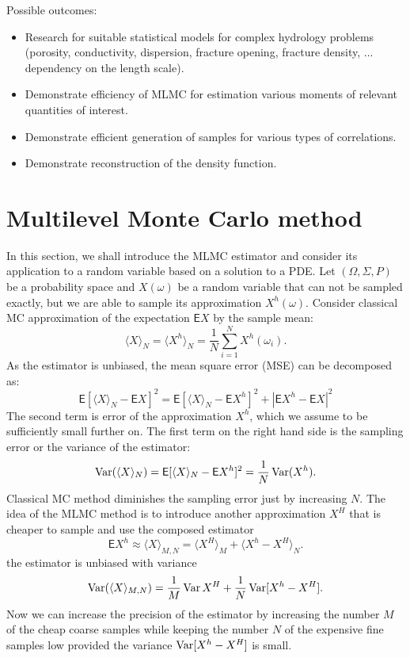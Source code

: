 \documentclass{article}
\def \E{{\mathsf E}}
\def\avg#1{\langle#1\rangle}
\def\Var{\mathop{\rm Var}}
\def\abs#1{|#1|}
\begin{document}
Possible outcomes:
\begin{itemize}
    \item Research for suitable statistical models for complex hydrology problems (porosity, conductivity, dispersion, fracture opening, fracture density, ... dependency on the length scale).
    \item Demonstrate efficiency of MLMC for estimation various moments of relevant quantities of interest.
    \item Demonstrate efficient generation of samples for various types of correlations.
    \item Demonstrate reconstruction of the density function.
\end{itemize}

\section{Multilevel Monte Carlo method}
In this section, we shall introduce the MLMC estimator and consider its application to a random variable based on a solution to a PDE.
Let $(\Omega, \Sigma, P)$ be a probability space and $X(\omega)$ be a random variable
that can not be sampled exactly, but we are able to sample its approximation $X^h(\omega)$. 
Consider classical MC approximation of the expectation $\E X$ by the sample mean:
\[
    \avg{X}_N = \avg{X^h}_N = \frac{1}{N}\sum_{i=1}^{N} X^h(\omega_i).
\]
As the estimator is unbiased, the mean square error (MSE) can be decomposed as:
\begin{equation}
    \label{eq:mc_mse}
    \E[\avg{X}_N - \E X]^2 = \E[\avg{X}_N - \E X^h ]^2 + \abs{\E X^h - \E X}^2
\end{equation}
The second term is error of the approximation $X^h$, which we assume to be sufficiently small further on.
The first term on the right hand side is the sampling error or the variance of the estimator:
\[
    \Var(\avg{X}_N) = \E[\avg{X}_N - \E X^h ]^2 = \frac{1}{N}\Var(X^h).
\]
 Classical MC method diminishes the sampling error just by increasing $N$. The idea of the MLMC method is to introduce another approximation $X^H$ that is cheaper to sample and use the composed estimator
\[
	\E X^h \approx \avg{X}_{M,N} = \avg{X^H}_M	 + \avg{X^h - X^H}_N. 
\]
the estimator is unbiased with variance
\[
	\Var(\avg{X}_{M,N}) =  \frac{1}{M}\Var{X^H} + \frac{1}{N}\Var[X^h-X^H]. 
\]
Now we can increase the precision of the estimator by increasing the number $M$ of the cheap coarse samples while keeping the number $N$ of the expensive fine samples low provided the variance
$\Var[X^h-X^H]$ is small. 
\end{document}

